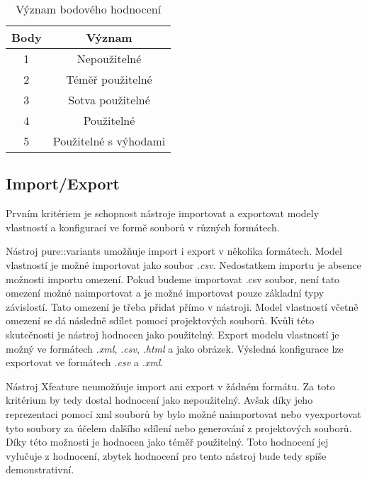 \begin{table}[H]
\centering
\begin{tabular}{|c|c|} 
\hline
\rowcolor[rgb]{0.937,0.937,0.937}  \textbf{Body}  & \textbf{Význam}        \\ 
\hline
1                                                 & Nepoužitelné           \\ 
\hline
2                                                 & Téměř použitelné       \\ 
\hline
3                                                 & Sotva použitelné       \\ 
\hline
4                                                 & Použitelné             \\ 
\hline
5                                                 & Použitelné s výhodami  \\
\hline
\end{tabular}
\caption{Význam bodového hodnocení}
\end{table}


\subsection{Import/Export}
Prvním kritériem je schopnost nástroje importovat a exportovat modely vlastností a konfigurací ve formě souborů v různých formátech.

Nástroj pure::variants umožňuje import i export v několika formátech. Model vlastností je možné importovat jako soubor \textit{.csv}. Nedostatkem importu je absence možnosti importu omezení. Pokud budeme importovat .csv soubor, není tato omezení možné naimportovat a je možné importovat pouze základní typy závislostí. Tato omezení je třeba přidat přímo v nástroji. Model vlastností včetně omezení se dá následně sdílet pomocí projektových souborů. Kvůli této skutečnosti je nástroj hodnocen jako použitelný. Export modelu vlastností je možný ve formátech \textit{.xml}, \textit{.csv}, \textit{.html} a jako obrázek. Výsledná konfigurace lze exportovat ve formátech \textit{.csv} a \textit{.xml}. 

Nástroj Xfeature neumožňuje import ani export v žádném formátu. Za toto kritérium by tedy dostal hodnocení jako nepoužitelný. Avšak díky jeho reprezentaci pomocí xml souborů by bylo možné naimportovat nebo vyexportovat tyto soubory za účelem dalšího sdílení nebo generování z projektových souborů. Díky této možnosti je hodnocen jako téměř použitelný. Toto hodnocení jej vylučuje z hodnocení, zbytek hodnocení pro tento nástroj bude tedy spíše demonstrativní.

